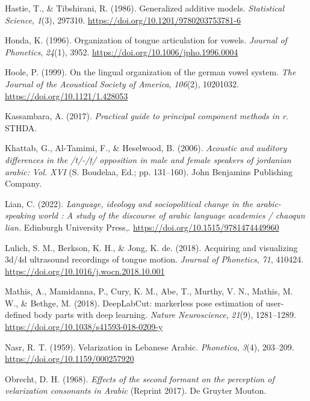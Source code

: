 \documentclass[
  man,
  longtable,
  nolmodern,
  notxfonts,
  notimes,
  colorlinks=true,linkcolor=blue,citecolor=blue,urlcolor=blue]{apa7}
\newlength{\cslhangindent}
\newenvironment{CSLReferences}[2] %
 {\begin{list}{}{%
  \setlength{\itemindent}{0pt}
  \setlength{\leftmargin}{0pt}
  \setlength{\parsep}{0pt}
  \ifodd #1
   \setlength{\leftmargin}{\cslhangindent}
   \setlength{\itemindent}{-1\cslhangindent}
  \fi
  \setlength{\itemsep}{#2\baselineskip}}}
 {\end{list}}
\begin{document}
\begin{CSLReferences}{1}{0}
Hastie, T., \& Tibshirani, R. (1986). Generalized additive models.
\emph{Statistical Science}, \emph{1}(3), 297310.
\url{https://doi.org/10.1201/9780203753781-6}

Honda, K. (1996). Organization of tongue articulation for vowels.
\emph{Journal of Phonetics}, \emph{24}(1), 3952.
\url{https://doi.org/10.1006/jpho.1996.0004}

Hoole, P. (1999). On the lingual organization of the german vowel
system. \emph{The Journal of the Acoustical Society of America},
\emph{106}(2), 10201032. \url{https://doi.org/10.1121/1.428053}

Kassambara, A. (2017). \emph{Practical guide to principal component
methods in r}. STHDA.

Khattab, G., Al-Tamimi, F., \& Heselwood, B. (2006). \emph{Acoustic and
auditory differences in the /t/-/ṭ/ opposition in male and female
speakers of jordanian arabic: Vol. XVI} (S. Boudelaa, Ed.; pp.
131--160). John Benjamins Publishing Company.

Lian, C. (2022). \emph{Language, ideology and sociopolitical change in
the arabic-speaking world : A study of the discourse of arabic language
academies / chaoqun lian.} Edinburgh University Press,.
\url{https://doi.org/10.1515/9781474449960}

Lulich, S. M., Berkson, K. H., \& Jong, K. de. (2018). Acquiring and
visualizing 3d/4d ultrasound recordings of tongue motion. \emph{Journal
of Phonetics}, \emph{71}, 410424.
\url{https://doi.org/10.1016/j.wocn.2018.10.001}

Mathis, A., Mamidanna, P., Cury, K. M., Abe, T., Murthy, V. N., Mathis,
M. W., \& Bethge, M. (2018). DeepLabCut: markerless pose estimation of
user-defined body parts with deep learning. \emph{Nature Neuroscience},
\emph{21}(9), 1281--1289.
\url{https://doi.org/10.1038/s41593-018-0209-y}

Nasr, R. T. (1959). Velarization in Lebanese Arabic. \emph{Phonetica},
\emph{3}(4), 203--209. \url{https://doi.org/10.1159/000257920}

Obrecht, D. H. (1968). \emph{Effects of the second formant on the
perception of velarization consonants in Arabic} (Reprint 2017). De
Gruyter Mouton.


\end{CSLReferences}
\end{document}
